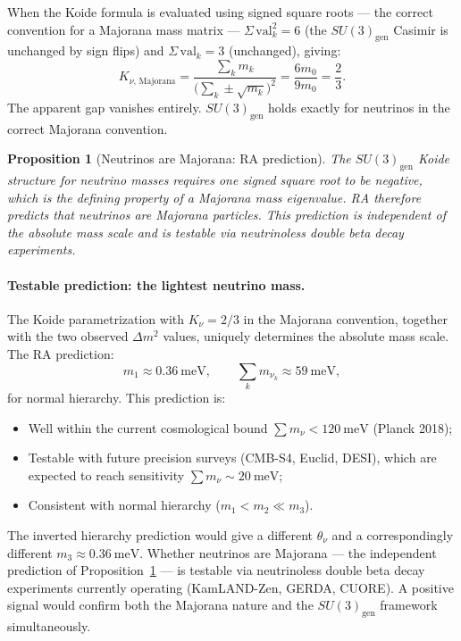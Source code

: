 \documentclass[11pt,a4paper]{article}
\newtheorem{proposition}[theorem]{Proposition}
\begin{document}
When the Koide formula is evaluated using signed square roots --- the correct
convention for a Majorana mass matrix --- $\Sigma\,\mathrm{val}_k^2 = 6$
(the $SU(3)_{\mathrm{gen}}$ Casimir is unchanged by sign flips)
and $\Sigma\,\mathrm{val}_k = 3$ (unchanged), giving:
\begin{equation}
  K_{\nu,\,\mathrm{Majorana}} = \frac{\sum_k m_k}{\bigl(\sum_k \pm\sqrt{m_k}\bigr)^2}
  = \frac{6m_0}{9m_0} = \frac{2}{3}.
  \label{eq:koide_majorana}
\end{equation}
The apparent gap vanishes entirely. $SU(3)_{\mathrm{gen}}$ holds exactly for
neutrinos in the correct Majorana convention.

\begin{proposition}[Neutrinos are Majorana: RA prediction]
\label{prop:majorana}
The $SU(3)_{\mathrm{gen}}$ Koide structure for neutrino masses requires one
signed square root to be negative, which is the defining property of a Majorana
mass eigenvalue. RA therefore predicts that neutrinos are Majorana particles.
This prediction is independent of the absolute mass scale and is testable via
neutrinoless double beta decay experiments.
\end{proposition}

\paragraph{Testable prediction: the lightest neutrino mass.}
The Koide parametrization with $K_\nu = 2/3$ in the Majorana convention,
together with the two observed $\Delta m^2$ values, uniquely determines
the absolute mass scale. The RA prediction:
\begin{equation}
  m_1 \approx 0.36~\text{meV}, \qquad
  \sum_k m_{\nu_k} \approx 59~\text{meV},
  \label{eq:neutrino_mass_pred}
\end{equation}
for normal hierarchy. This prediction is:
\begin{itemize}[noitemsep]
  \item Well within the current cosmological bound
  $\sum m_\nu < 120~\text{meV}$ (Planck 2018);
  \item Testable with future precision surveys (CMB-S4, Euclid,
  DESI), which are expected to reach sensitivity $\sum m_\nu \sim 20~\text{meV}$;
  \item Consistent with normal hierarchy ($m_1 < m_2 \ll m_3$).
\end{itemize}

The inverted hierarchy prediction would give a different $\theta_\nu$ and
a correspondingly different $m_3 \approx 0.36~\text{meV}$.
Whether neutrinos are Majorana --- the independent prediction of
Proposition~\ref{prop:majorana} --- is testable via neutrinoless double
beta decay experiments currently operating (KamLAND-Zen, GERDA, CUORE).
A positive signal would confirm both the Majorana nature and the
$SU(3)_{\mathrm{gen}}$ framework simultaneously.
\end{document}
